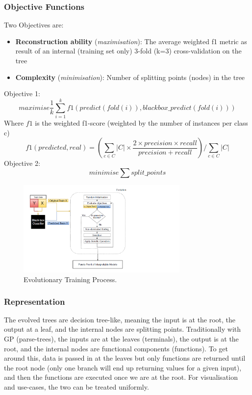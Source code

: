 \subsubsection{Objective Functions}
Two Objectives are:
\begin{itemize}
\item \textbf{Reconstruction ability} (\textit{maximisation}): The average weighted f1 metric as result of an internal (training set only) 3-fold (k=3) cross-validation on the tree
\end{itemize}
\begin{itemize}
\item \textbf{Complexity} (\textit{minimisation}): Number of splitting points (nodes) in the tree
\end{itemize}
Objective 1:
\begin{equation} \label{eq:obj1}
maximise \frac {1}{k} \sum_{i=1}^k f1(predict(fold(i)),blackbox\_predict(fold(i)))
\end{equation}
Where $f1$ is the weighted f1-score (weighted by the number of instances per class c)
\begin{displaymath}
f1(predicted, real) = (\sum_{c\in C} |C| \times \frac{2\times precision\times recall}{precision+recall})/\sum_{c\in C} |C|
\end{displaymath}
Objective 2:
\begin{equation}
minimise \sum split\_points
\end{equation}
\begin{figure}
\includegraphics[width=0.75\textwidth]{evolution_process_resized}
\caption{Evolutionary Training Process.}
\end{figure}

\subsubsection{Representation}
The evolved trees are decision tree-like, meaning the input is at the root, the output at a leaf, and the internal nodes are splitting points. Traditionally with GP (parse-trees), the inputs are at the leaves (terminals), the output is at the root, and the internal nodes are functional components (functions). To get around this, data is passed in at the leaves but only functions are returned until the root node (only one branch will end up returning values for a given input), and then the functions are executed once we are at the root. For visualisation and use-cases, the two can be treated uniformly. 

